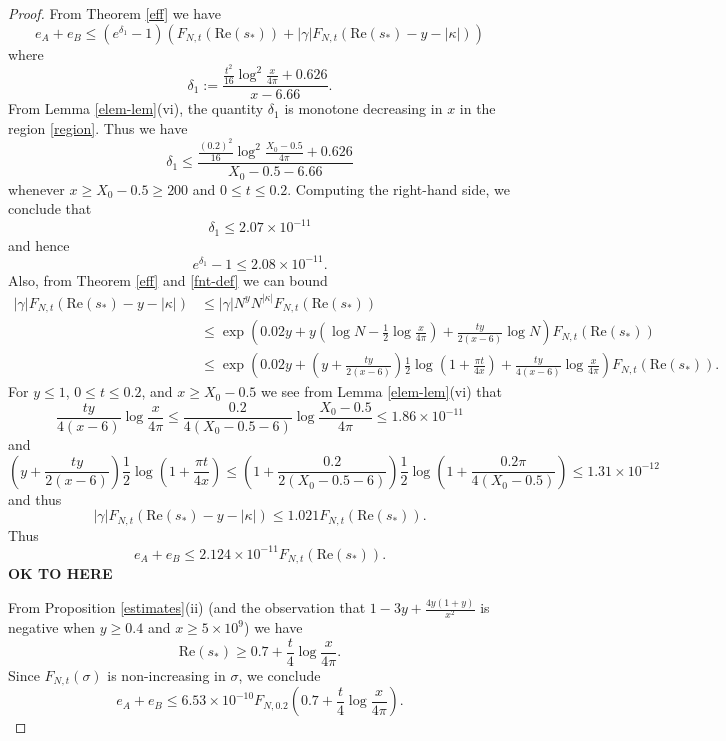 \begin{proof}
From Theorem \ref{eff} we have
\begin{equation}\label{eaeb-bound}
 e_A + e_B \leq (e^{\delta_1}-1) (F_{N,t}(\mathrm{Re}(s_*)) + |\gamma| F_{N,t}( \mathrm{Re}(s_*) - y - |\kappa| ) )
\end{equation}
where
$$ \delta_1 := \frac{\frac{t^2}{16} \log^2 \frac{x}{4\pi} + 0.626}{x-6.66}.$$
From Lemma \ref{elem-lem}(vi), the quantity $\delta_1$ is monotone decreasing in $x$ in the region \eqref{region}.  Thus we have
\begin{equation}\label{delta1-bound}
 \delta_1 \leq \frac{\frac{(0.2)^2}{16} \log^2 \frac{X_0-0.5}{4\pi} + 0.626}{X_0-0.5-6.66}
\end{equation}
whenever $x \geq X_0-0.5 \geq 200$ and $0 \leq t \leq 0.2$.  Computing the right-hand side, we conclude that
$$  \delta_1 \leq 2.07 \times 10^{-11}$$
and hence
$$ e^{\delta_1} - 1 \leq 2.08 \times 10^{-11}.$$
Also, from Theorem \ref{eff} and \eqref{fnt-def} we can bound
\begin{align*}
|\gamma| F_{N,t}( \mathrm{Re}(s_*) - y - |\kappa| ) &\leq |\gamma| N^y N^{|\kappa|} F_{N,t}( \mathrm{Re}(s_*) ) \\
&\leq \exp( 0.02 y + y (\log N - \frac{1}{2} \log \frac{x}{4\pi}) + \frac{ty}{2(x-6)} \log N ) F_{N,t}( \mathrm{Re}(s_*) )  \\
&\leq \exp( 0.02 y + (y + \frac{ty}{2(x-6)}) \frac{1}{2} \log(1 + \frac{\pi t}{4x}) + \frac{ty}{4(x-6)} \log \frac{x}{4\pi} ) F_{N,t}( \mathrm{Re}(s_*) ).
\end{align*}
For $y \leq 1$, $0 \leq t \leq 0.2$, and $x \geq X_0 - 0.5$ we see from Lemma \ref{elem-lem}(vi) that
$$ \frac{ty}{4(x-6)} \log \frac{x}{4\pi} \leq \frac{0.2}{4(X_0 - 0.5-6)}\log \frac{X_0 - 0.5}{4\pi} \leq 1.86 \times 10^{-11}$$
and
$$ (y + \frac{ty}{2(x-6)}) \frac{1}{2} \log(1 + \frac{\pi t}{4x}) \leq (1 + \frac{0.2}{2(X_0-0.5-6)}) \frac{1}{2} \log(1 + \frac{0.2 \pi}{4(X_0-0.5)}) \leq 1.31 \times 10^{-12}$$
and thus
\begin{equation}\label{gafn}
 |\gamma| F_{N,t}( \mathrm{Re}(s_*) - y - |\kappa| ) \leq 1.021  F_{N,t}( \mathrm{Re}(s_*) ).
\end{equation}
Thus
$$  e_A + e_B \leq 2.124 \times 10^{-11} F_{N,t}( \mathrm{Re}(s_*) ).$$
{\bf OK TO HERE}

From Proposition \ref{estimates}(ii) (and the observation that $1-3y+\frac{4y(1+y)}{x^2}$ is negative when $y \geq 0.4$ and $x \geq 5 \times 10^9$) we have
$$ \mathrm{Re}(s_*) \geq 0.7 + \frac{t}{4} \log \frac{x}{4\pi}.$$
Since $F_{N,t}(\sigma)$ is non-increasing in $\sigma$, we conclude
$$  e_A + e_B \leq 6.53 \times 10^{-10} F_{N,0.2}( 0.7 + \frac{t}{4} \log \frac{x}{4\pi} ).$$


\end{proof}
